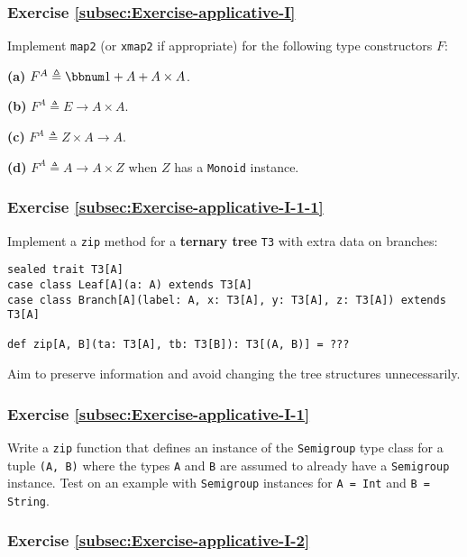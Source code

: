 \subsubsection{Exercise \label{subsec:Exercise-applicative-I}\ref{subsec:Exercise-applicative-I}}

Implement \lstinline!map2! (or \lstinline!xmap2! if appropriate)
for the following type constructors $F$:

\textbf{(a)} $F^{A}\triangleq\bbnum 1+A+A\times A$.

\textbf{(b)} $F^{A}\triangleq E\rightarrow A\times A$.

\textbf{(c)} $F^{A}\triangleq Z\times A\rightarrow A$.

\textbf{(d)} $F^{A}\triangleq A\rightarrow A\times Z$ when $Z$ has
a \lstinline!Monoid! instance.

\subsubsection{Exercise \label{subsec:Exercise-applicative-I-1-1}\ref{subsec:Exercise-applicative-I-1-1}}

Implement a \lstinline!zip! method for a \textbf{ternary tree}
\lstinline!T3! with extra data on branches:
\begin{lstlisting}
sealed trait T3[A]
case class Leaf[A](a: A) extends T3[A]
case class Branch[A](label: A, x: T3[A], y: T3[A], z: T3[A]) extends T3[A]

def zip[A, B](ta: T3[A], tb: T3[B]): T3[(A, B)] = ???
\end{lstlisting}
Aim to preserve information and avoid changing the tree structures
unnecessarily.

\subsubsection{Exercise \label{subsec:Exercise-applicative-I-1}\ref{subsec:Exercise-applicative-I-1}}

Write a \lstinline!zip! function that defines an instance of the
\lstinline!Semigroup! type class for a tuple \lstinline!(A, B)!
where the types \lstinline!A! and \lstinline!B! are assumed to already
have a \lstinline!Semigroup! instance. Test on an example with \lstinline!Semigroup!
instances for \lstinline!A = Int! and \lstinline!B = String!.

\subsubsection{Exercise \label{subsec:Exercise-applicative-I-2}\ref{subsec:Exercise-applicative-I-2}}

